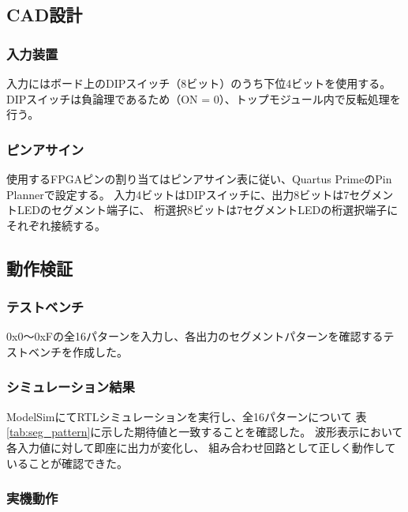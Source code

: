 \documentclass[a4paper,11pt]{ltjsarticle}
\begin{document}
\subsection{CAD設計}

\subsubsection{入力装置}

入力にはボード上のDIPスイッチ（8ビット）のうち下位4ビットを使用する。
DIPスイッチは負論理であるため（ON = 0）、トップモジュール内で反転処理を行う。

\subsubsection{ピンアサイン}

使用するFPGAピンの割り当てはピンアサイン表に従い、Quartus PrimeのPin Plannerで設定する。
入力4ビットはDIPスイッチに、出力8ビットは7セグメントLEDのセグメント端子に、
桁選択8ビットは7セグメントLEDの桁選択端子にそれぞれ接続する。

\subsection{動作検証}

\subsubsection{テストベンチ}

0x0〜0xFの全16パターンを入力し、各出力のセグメントパターンを確認するテストベンチを作成した。



\subsubsection{シミュレーション結果}

ModelSimにてRTLシミュレーションを実行し、全16パターンについて
表\ref{tab:seg_pattern}に示した期待値と一致することを確認した。
波形表示において各入力値に対して即座に出力が変化し、
組み合わせ回路として正しく動作していることが確認できた。

\subsubsection{実機動作}
\end{document}
